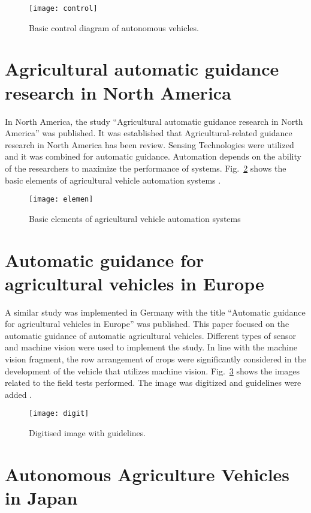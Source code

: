 \begin{figure}[!h]
	\centering
	\texttt{[image: control]}
	\caption{Basic control diagram of autonomous vehicles.}
	\label{fig:con}
\end{figure}

\section{Agricultural automatic guidance research in North America}

In North America, the study “Agricultural automatic guidance research in North America” was published. It was established that Agricultural-related guidance research in North America has been review. Sensing Technologies were utilized and it was combined for automatic guidance. Automation depends on the ability of the researchers to maximize the performance of systems. Fig.~\ref{fig:elemen} shows the basic elements of agricultural vehicle automation systems \cite{Reid2000}.

\begin{figure}[!h]
	\centering
	\texttt{[image: elemen]}
	\caption{Basic elements of agricultural vehicle automation systems}
	\label{fig:elemen}
\end{figure}

\section{Automatic guidance for agricultural vehicles in Europe}

A similar study was implemented in Germany with the title “Automatic guidance for agricultural vehicles in Europe” was published. This paper focused on the automatic guidance of automatic agricultural vehicles. Different types of sensor and machine vision were used to implement the study. In line with the machine vision fragment, the row arrangement of crops were significantly considered in the development of the vehicle that utilizes machine vision. Fig.~\ref{fig:digit} shows the images related to the field tests performed. The image was digitized and guidelines were added \cite{Keicher2000}.

\begin{figure}[!h]
	\centering
	\texttt{[image: digit]}
	\caption{Digitised image with guidelines.}
	\label{fig:digit}
\end{figure}

\section{Autonomous Agriculture Vehicles in Japan}

